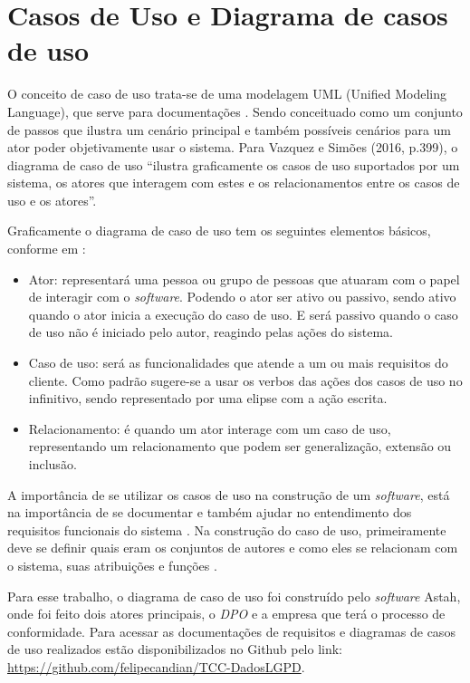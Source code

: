 \documentclass[
	12pt,				%
	openright,			%
	oneside,			%
	a4paper,			%
	english,			%
	french,				%
	spanish,			%
	brazil,				%
	]{abntex2}
\begin{document}
\section{Casos de Uso e Diagrama de casos de uso}

O conceito de caso de uso trata-se de uma modelagem UML (Unified Modeling Language), que serve para documentações  \cite{Sommerville2011}. Sendo conceituado como um conjunto de passos que ilustra um cenário principal e também possíveis cenários para um ator poder objetivamente usar o sistema. Para Vazquez e Simões (2016, p.399), o diagrama de caso de uso “ilustra graficamente os casos de uso suportados por um sistema, os atores que interagem com estes e os relacionamentos entre os casos de uso e os atores”.

Graficamente o diagrama de caso de uso tem os seguintes elementos básicos, conforme em \cite{Vazquez2016}:

\begin{itemize}
\item Ator: representará uma pessoa ou grupo de pessoas que atuaram com o papel de interagir com o \textit{software}. Podendo o ator ser ativo ou passivo, sendo ativo quando o ator inicia a execução do caso de uso. E será passivo quando o caso de uso não é iniciado pelo autor, reagindo pelas ações do sistema.
\item Caso de uso: será as funcionalidades que atende a um ou mais requisitos do cliente. Como padrão sugere-se a usar os verbos das ações dos casos de uso no infinitivo, sendo representado por uma elipse com a ação escrita.
\item Relacionamento: é quando um ator interage com um caso de uso, representando um relacionamento que podem ser generalização, extensão ou inclusão.
\end{itemize}

A importância de se utilizar os casos de uso na construção de um \textit{software}, está na importância de se documentar e também ajudar no entendimento dos requisitos funcionais do sistema \cite{Fowler2007}. Na construção do caso de uso, primeiramente deve se definir quais eram os conjuntos de autores e como eles se relacionam com o sistema, suas atribuições e funções \cite{Pressman2011}.

Para esse trabalho, o diagrama de caso de uso foi construído pelo \textit{software} Astah, onde foi feito dois atores principais, o \textit{DPO} e a empresa que terá o processo de conformidade. Para acessar as documentações de requisitos e diagramas de casos de uso realizados estão disponibilizados no Github pelo link: \url{https://github.com/felipecandian/TCC-DadosLGPD}.
\end{document}
